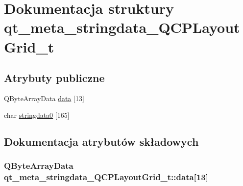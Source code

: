 \hypertarget{structqt__meta__stringdata___q_c_p_layout_grid__t}{}\section{Dokumentacja struktury qt\+\_\+meta\+\_\+stringdata\+\_\+\+Q\+C\+P\+Layout\+Grid\+\_\+t}
\label{structqt__meta__stringdata___q_c_p_layout_grid__t}
\subsection*{Atrybuty publiczne}
\begin{DoxyCompactItemize}
\item 
Q\+Byte\+Array\+Data \hyperlink{structqt__meta__stringdata___q_c_p_layout_grid__t_ab9a2518e0da08ddfb279fb649cdec091}{data} \mbox{[}13\mbox{]}
\item 
char \hyperlink{structqt__meta__stringdata___q_c_p_layout_grid__t_a0592c486ce0adf2a3a83670727f00df2}{stringdata0} \mbox{[}165\mbox{]}
\end{DoxyCompactItemize}


\subsection{Dokumentacja atrybutów składowych}
\subsubsection[{\texorpdfstring{data}{data}}]{\setlength{\rightskip}{0pt plus 5cm}Q\+Byte\+Array\+Data qt\+\_\+meta\+\_\+stringdata\+\_\+\+Q\+C\+P\+Layout\+Grid\+\_\+t\+::data\mbox{[}13\mbox{]}}\hypertarget{structqt__meta__stringdata___q_c_p_layout_grid__t_ab9a2518e0da08ddfb279fb649cdec091}{}\label{structqt__meta__stringdata___q_c_p_layout_grid__t_ab9a2518e0da08ddfb279fb649cdec091}
